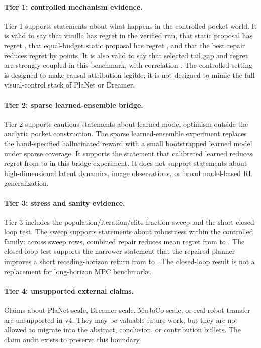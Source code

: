 \paragraph{Tier 1: controlled mechanism evidence.}
Tier 1 supports statements about what happens in the controlled pocket world.
It is valid to say that vanilla \cem{} has regret \VFourCEMRegret{} in the
verified run, that static proposal has regret \VFourStaticRegret{}, that
equal-budget static proposal has regret \VFourEqualStaticRegret{}, and that
the best repair reduces regret by \VFourBestRepairGain{} points. It is also
valid to say that selected tail gap and regret are strongly coupled in this
benchmark, with correlation \VFourTailGapRegretCorr{}. The controlled setting
is designed to make causal attribution legible; it is not designed to mimic
the full visual-control stack of PlaNet or Dreamer.

\paragraph{Tier 2: sparse learned-ensemble bridge.}
Tier 2 supports cautious statements about learned-model optimism outside the
analytic pocket construction. The sparse learned-ensemble experiment replaces
the hand-specified hallucinated reward with a small bootstrapped learned model
under sparse coverage. It supports the statement that calibrated learned
\cem{} reduces regret from \VFourLearnedCEMRegret{} to
\VFourLearnedCalibratedRegret{} in this bridge experiment. It does not
support statements about high-dimensional latent dynamics, image observations,
or broad model-based RL generalization.

\paragraph{Tier 3: stress and sanity evidence.}
Tier 3 includes the population/iteration/elite-fraction sweep and the short
closed-loop test. The sweep supports statements about robustness within the
controlled family: across \VFourSweepRows{} sweep rows, combined repair
reduces mean regret from \VFourSweepCEMRegret{} to
\VFourSweepRepairedRegret{}. The closed-loop test supports the narrower
statement that the repaired planner improves a short receding-horizon return
from \VFourClosedLoopCEM{} to \VFourClosedLoopRepair{}. The closed-loop
result is not a replacement for long-horizon MPC benchmarks.

\paragraph{Tier 4: unsupported external claims.}
Claims about PlaNet-scale, Dreamer-scale, MuJoCo-scale, or real-robot transfer
are unsupported in v4. They may be valuable future work, but they are not
allowed to migrate into the abstract, conclusion, or contribution bullets. The
claim audit exists to preserve this boundary.

